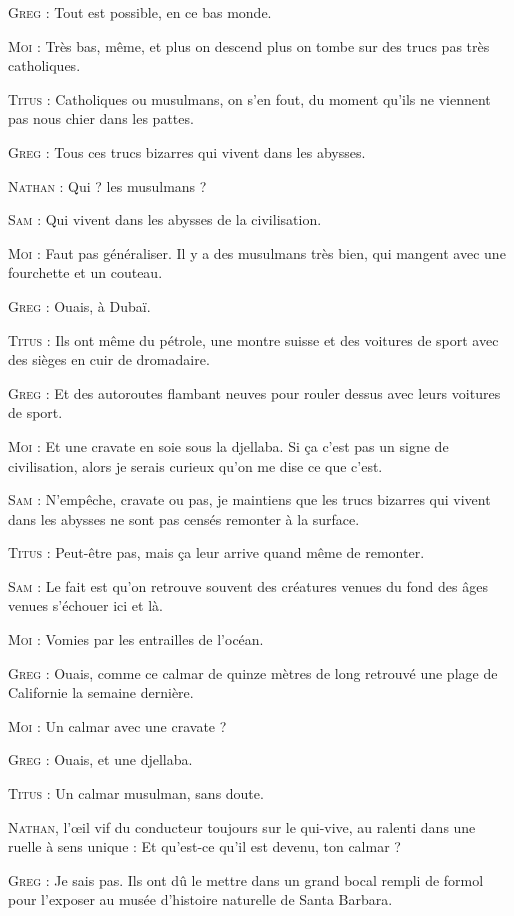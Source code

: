 \begin{dialogue}
\textsc{Greg} : Tout est possible, en ce bas monde.

\textsc{Moi} : Très bas, même, et plus on descend plus on tombe sur des trucs pas très catholiques.

\textsc{Titus} : Catholiques ou musulmans, on s’en fout, du moment qu’ils ne viennent pas nous chier dans les pattes.

\textsc{Greg} : Tous ces trucs bizarres qui vivent dans les abysses.

\textsc{Nathan} : Qui ? les musulmans ?

\textsc{Sam} : Qui vivent dans les abysses de la civilisation.

\textsc{Moi} : Faut pas généraliser. Il y a des musulmans très bien, qui mangent avec une fourchette et un couteau.

\textsc{Greg} : Ouais, à Dubaï.

\textsc{Titus} : Ils ont même du pétrole, une montre suisse et des voitures de sport avec des sièges en cuir de dromadaire.

\textsc{Greg} : Et des autoroutes flambant neuves pour rouler dessus avec leurs voitures de sport.

\textsc{Moi} : Et une cravate en soie sous la djellaba. Si ça c’est pas un signe de civilisation, alors je serais curieux qu’on me dise ce que c’est.

\textsc{Sam} : N’empêche, cravate ou pas, je maintiens que les trucs bizarres qui vivent dans les abysses ne sont pas censés remonter à la surface.

\textsc{Titus} : Peut-être pas, mais ça leur arrive quand même de remonter.

\textsc{Sam} : Le fait est qu’on retrouve souvent des créatures venues du fond des âges venues s’échouer ici et là.

\textsc{Moi} : Vomies par les entrailles de l’océan.

\textsc{Greg} : Ouais, comme ce calmar de quinze mètres de long retrouvé une plage de Californie la semaine dernière.

\textsc{Moi} : Un calmar avec une cravate ?

\textsc{Greg} : Ouais, et une djellaba.

\textsc{Titus} : Un calmar musulman, sans doute.

\textsc{Nathan}, l’œil vif du conducteur toujours sur le qui-vive, au ralenti dans une ruelle à sens unique : Et qu’est-ce qu’il est devenu, ton calmar ?

\textsc{Greg} : Je sais pas. Ils ont dû le mettre dans un grand bocal rempli de formol pour l’exposer au musée d’histoire naturelle de Santa Barbara.


\end{dialogue}
